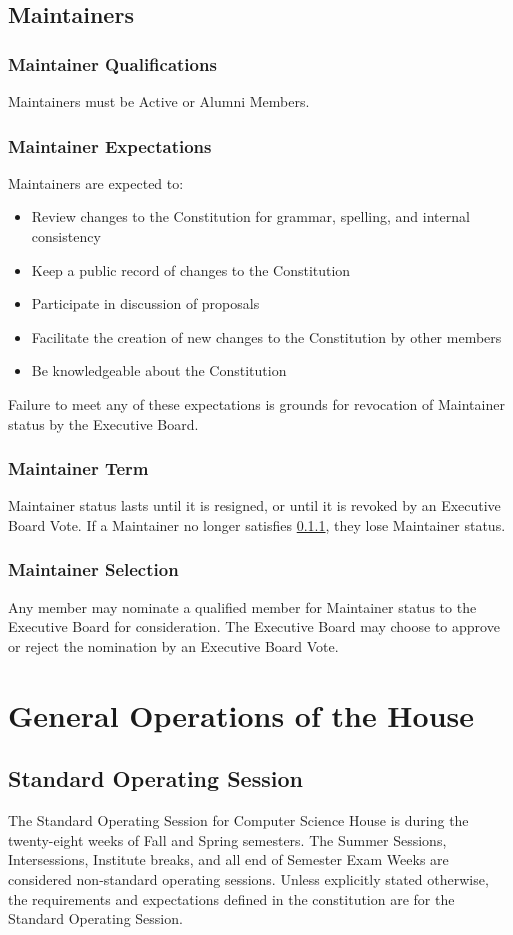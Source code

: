 \documentclass{article}
\newcommand{\article}[1]{\section{#1} \label{#1}}
\newcommand{\asection}[1]{\subsection{#1} \label{#1}}
\newcommand{\asubsection}[1]{\subsubsection{#1} \label{#1}}
\begin{document}
\asection{Maintainers}

\asubsection{Maintainer Qualifications}
Maintainers must be Active or Alumni Members.

\asubsection{Maintainer Expectations}
Maintainers are expected to:
\begin{itemize}
	\item Review changes to the Constitution for grammar, spelling, and internal consistency
	\item Keep a public record of changes to the Constitution
	\item Participate in discussion of proposals
	\item Facilitate the creation of new changes to the Constitution by other members
	\item Be knowledgeable about the Constitution
\end{itemize}
Failure to meet any of these expectations is grounds for revocation of Maintainer status by the Executive Board.

\asubsection{Maintainer Term}
Maintainer status lasts until it is resigned, or until it is revoked by an Executive Board Vote.
If a Maintainer no longer satisfies \ref{Maintainer Qualifications}, they lose Maintainer status.

\asubsection{Maintainer Selection}
Any member may nominate a qualified member for Maintainer status to the Executive Board for consideration.
The Executive Board may choose to approve or reject the nomination by an Executive Board Vote.

\article{General Operations of the House}
\asection{Standard Operating Session}
The Standard Operating Session for Computer Science House is during the twenty-eight weeks of Fall and Spring semesters.
The Summer Sessions, Intersessions, Institute breaks, and all end of Semester Exam Weeks are considered non-standard operating sessions.
Unless explicitly stated otherwise, the requirements and expectations defined in the constitution are for the Standard Operating Session.
\end{document}
